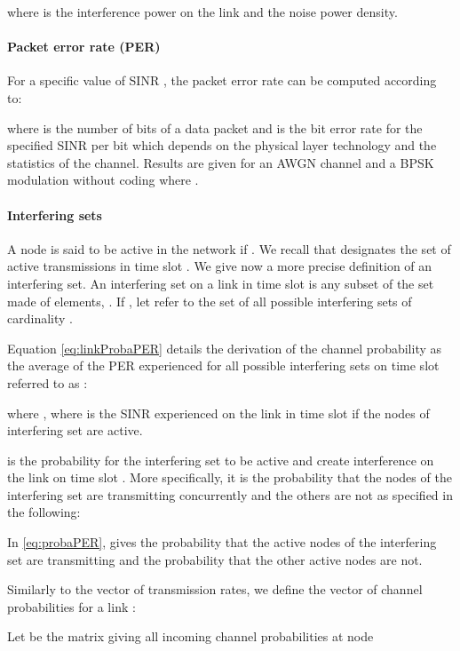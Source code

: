 \documentclass[a4paper]{article}
\begin{document}
where  is the interference power on the link and  the noise power density.

\paragraph*{Packet error rate (PER)}
For a specific value of SINR , the packet error rate  can be computed according to:

\noindent where  is the number of bits of a data packet and  is the bit error rate for the specified SINR per bit  which depends on the physical layer technology and the statistics of the channel.
Results are given for an AWGN channel and a BPSK modulation without coding where .

\paragraph*{Interfering sets}
A node  is said to be active in the network if . We recall that  designates the set of active transmissions in time slot . 
We give now a more precise definition of an interfering set. An interfering set  on a link  in time slot  is any subset of the set  made of  elements, .
If , let  refer to the set of all possible interfering sets of cardinality .

\vspace{\baselineskip}

Equation \eqref{eq:linkProbaPER} details the derivation of the channel probability  as the average of the PER experienced for all possible interfering sets  on time slot  referred to as :

\noindent where , where  is the SINR experienced on the link  in time slot  if the nodes of interfering set  are active.  

 is the probability for the interfering set  to be active and create interference on the link  on time slot . More specifically, it is the probability that the nodes of the interfering set  are transmitting concurrently and the others are not as specified in the following:

In \eqref{eq:probaPER},  gives the probability that the  active nodes of the interfering set  are transmitting and  the probability that the  other active nodes are not.

Similarly to the vector of transmission rates, we define the vector of channel probabilities for a link :


Let  be the matrix giving all incoming channel probabilities at node 
\end{document}

